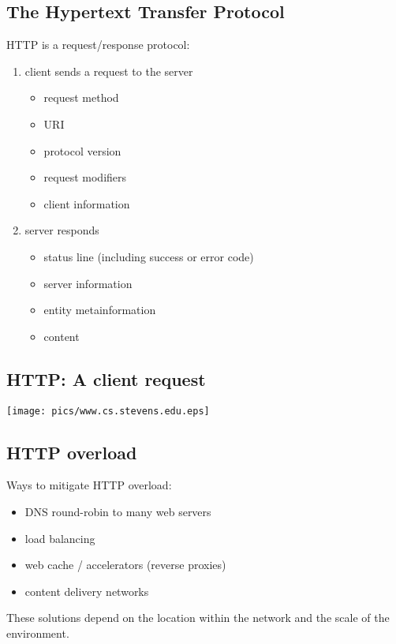 \documentclass[xga]{xdvislides}
\begin{document}
\subsection{The Hypertext Transfer Protocol}
HTTP is a request/response protocol:
\begin{enumerate}
	\item client sends a request to the server
		\begin{itemize}
			\item request method
			\item URI
			\item protocol version
			\item request modifiers
			\item client information
		\end{itemize}
	\item server responds
		\begin{itemize}
			\item status line (including success or error code)
			\item server information
			\item entity metainformation
			\item content
		\end{itemize}
\end{enumerate}

\subsection{HTTP: A client request}
\begin{center}
	\texttt{[image: pics/www.cs.stevens.edu.eps]}
\end{center}

\subsection{HTTP overload}
Ways to mitigate HTTP overload:

\begin{itemize}
	\item DNS round-robin to many web servers
	\item load balancing
	\item web cache / accelerators (reverse proxies)
	\item content delivery networks
\end{itemize}

These solutions depend on the location within the network and the scale of
the environment.
\end{document}
